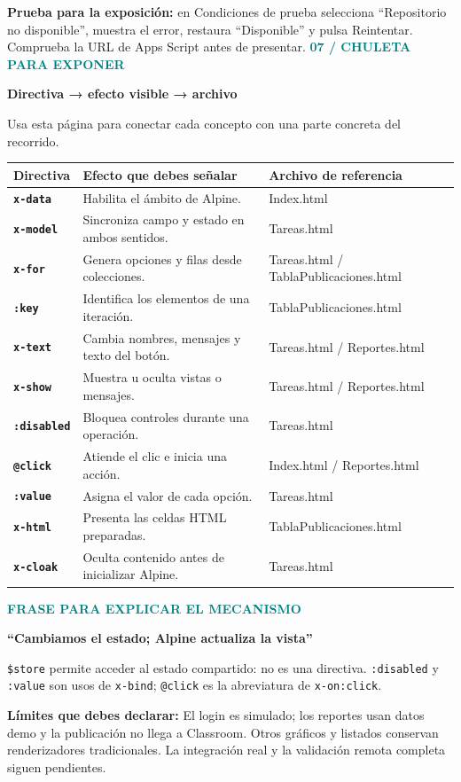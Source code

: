 \documentclass[11pt,a4paper]{article}
\newcommand{\titulo}[3]{\textcolor{teal}{\small\textbf{#1}}\par{\LARGE\bfseries #2}\par\vspace{2mm}#3\par\vspace{3mm}}
\newcommand{\paso}[4]{\begin{tcolorbox}[colback=#1!5!white,colframe=#1!40!white,boxrule=0.5pt,arc=2mm,left=3mm,right=3mm,top=2mm,bottom=2mm]\textcolor{#1}{\textbf{#2}}\par\textbf{#3}\par #4\end{tcolorbox}}
\newcommand{\nota}[2]{\begin{tcolorbox}[colback=amber!8!white,colframe=amber!40!white,boxrule=0.5pt,arc=2mm]\textcolor{amber}{\textbf{#1}} #2\end{tcolorbox}}
\newcommand{\met}[1]{\texttt{#1}}
\begin{document}
\textbf{Prueba para la exposición:} en Condiciones de prueba selecciona ``Repositorio no disponible'', muestra el error, restaura ``Disponible'' y pulsa Reintentar. Comprueba la URL de Apps Script antes de presentar.
\newpage
\titulo{07 / CHULETA PARA EXPONER}{Directiva → efecto visible → archivo}{Usa esta página para conectar cada concepto con una parte concreta del recorrido.}
\renewcommand{\arraystretch}{1.55}
\begin{tabularx}{\textwidth}{>{\bfseries\color{teal}}p{25mm} X p{48mm}}
Directiva & Efecto que debes señalar & Archivo de referencia\\\hline
\met{x-data} & Habilita el ámbito de Alpine. & Index.html\\
\met{x-model} & Sincroniza campo y estado en ambos sentidos. & Tareas.html\\
\met{x-for} & Genera opciones y filas desde colecciones. & Tareas.html / TablaPublicaciones.html\\
\met{:key} & Identifica los elementos de una iteración. & TablaPublicaciones.html\\
\met{x-text} & Cambia nombres, mensajes y texto del botón. & Tareas.html / Reportes.html\\
\met{x-show} & Muestra u oculta vistas o mensajes. & Tareas.html / Reportes.html\\
\met{:disabled} & Bloquea controles durante una operación. & Tareas.html\\
\met{@click} & Atiende el clic e inicia una acción. & Index.html / Reportes.html\\
\met{:value} & Asigna el valor de cada opción. & Tareas.html\\
\met{x-html} & Presenta las celdas HTML preparadas. & TablaPublicaciones.html\\
\met{x-cloak} & Oculta contenido antes de inicializar Alpine. & Tareas.html\\
\end{tabularx}
\vspace{5mm}
\paso{teal}{FRASE PARA EXPLICAR EL MECANISMO}{``Cambiamos el estado; Alpine actualiza la vista''}{\met{\$store} permite acceder al estado compartido: no es una directiva. \met{:disabled} y \met{:value} son usos de \met{x-bind}; \met{@click} es la abreviatura de \met{x-on:click}.}
\nota{Límites que debes declarar:}{El login es simulado; los reportes usan datos demo y la publicación no llega a Classroom. Otros gráficos y listados conservan renderizadores tradicionales. La integración real y la validación remota completa siguen pendientes.}
\end{document}

